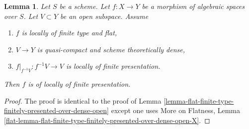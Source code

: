 \documentclass[10pt,a4paper]{amsart}
\theoremstyle{plain}
\newtheorem{lemma}[subsection]{Lemma}
\theoremstyle{definition}
\theoremstyle{remark}
\numberwithin{equation}{subsection}
\begin{document}
\begin{lemma}
\label{lemma-flat-finite-type-finitely-presented-over-dense-open-X}
Let $S$ be a scheme.
Let $f : X \to Y$ be a morphism of algebraic spaces over $S$.
Let $V \subset Y$ be an open subspace.
Assume
\begin{enumerate}
\item $f$ is locally of finite type and flat,
\item $V \to Y$ is quasi-compact and scheme theoretically dense,
\item $f|_{f^{-1}V} : f^{-1}V \to V$ is locally of finite presentation.
\end{enumerate}
Then $f$ is of locally of finite presentation.
\end{lemma}

\begin{proof}
The proof is identical to the proof of
Lemma \ref{lemma-flat-finite-type-finitely-presented-over-dense-open}
except one uses
More on Flatness, Lemma
\ref{flat-lemma-flat-finite-type-finitely-presented-over-dense-open-X}.
\end{proof}
\end{document}
